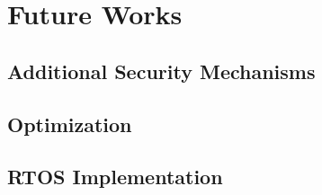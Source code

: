 \chapter{Future Works}
\label{cha:future}

\section{Additional Security Mechanisms}
\label{sec:future_security}

\section{Optimization}
\label{sec:future_optimization}

\section{RTOS Implementation}
\label{sec:future_rtos}
